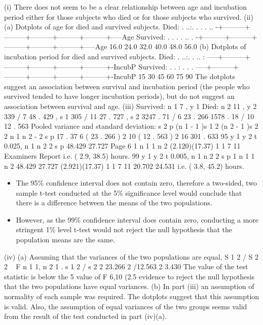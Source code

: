 \documentclass[a4paper,12pt]{article}
\begin{document}
(i) There does not seem to be a clear relationship between age and incubation
period either for those subjects who died or for those subjects who survived.
(ii) (a)
Dotplots of age for died and survived subjects.
Died:
. ..:.
. .
.
..
-+---------+---------+---------+---------+---------+-----Age
Survived:
.
.
.
.
..
.
-+---------+---------+---------+---------+---------+-----Age
16.0
24.0
32.0
40.0
48.0
56.0
(b)
Dotplots of incubation period for died and survived subjects.
Died:
. ..:.
. ..
:
-----+---------+---------+---------+---------+---------+-IncubP
Survived:
.
.
: .
.
.
-----+---------+---------+---------+---------+---------+-IncubP
15
30
45
60
75
90
The dotplots suggest an association between survival and incubation period
(the people who survived tended to have longer incubation periods), but do not
suggest an association between survival and age.
(iii)
Survived: n 1
7 , y 1
Died: n 2 11 , y 2
339 / 7 48 . 429 , s 1
305 / 11
27 . 727 , s 2
3247 . 71 / 6 23 . 266
1578 . 18 / 10 12 . 563
Pooled variance and standard deviation:
s 2 p (n 1 - 1 )s 1 2 (n 2 - 1 )s 2 2
n 1 n 2 - 2
s p 17 . 37
6 ( 23 . 266 ) 2 10 ( 12 . 563 ) 2
16
301 . 633
95%
y 1
y 2 t 0.025, n 1
n 2 2 s p
48.429 27.727
Page 6
1
n 1
1
n 2
(2.120)(17.37)
1 1
7 11
Examiners Report
i.e. ( 2.9, 38.5) hours.
99%
y 1
y 2 t 0.005, n 1
n 2 2 s p
1
n 1
1
n 2
48.429 27.727 (2.921)(17.37)
1 1
7 11
20.702 24.531
i.e. ( 3.8, 45.2) hours.
\begin{itemize}
    \item The 95\% confidence interval does not contain zero, therefore a two-sided, two
sample t-test conducted at the 5\% significance level would conclude that there
is a difference between the means of the two populations.
\item However, as the 99\% confidence interval does contain zero, conducting a
more stringent 1\% level t-test would not reject the null hypothesis that the
population means are the same.
\end{itemize}

(iv)
(a)
Assuming that the variances of the two populations are equal,
S 1 2 / S 2 2 ~ F n 1 1, n 2 1 .
s 1 2 / s 2 2
23.266 2 /12.563 2
3.430
The value of the test statistic is below the 5%
value of F 6,10 (2.5%
evidence to reject the null hypothesis that the two populations have
equal variances.
(b)
In part (iii) an assumption of normality of each sample was required.
The dotplots suggest that this assumption is valid.
Also, the assumption of equal variances of the two groups seems valid
from the result of the test conducted in part (iv)(a).
\newpage
\end{document}
